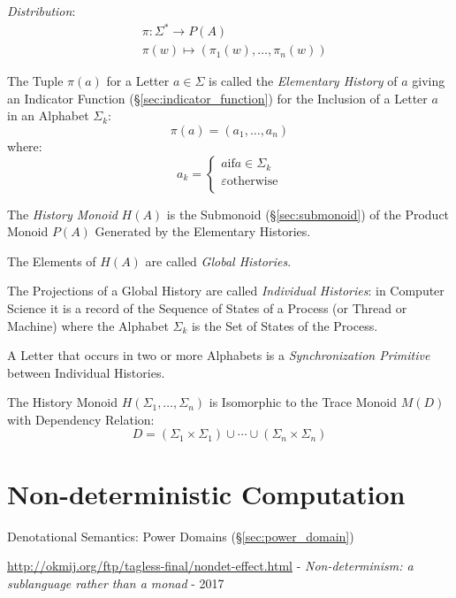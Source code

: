 \emph{Distribution}:
\begin{align*}
  & \pi : \Sigma^* \rightarrow P(A) \\
  & \pi(w) \mapsto (\pi_1(w), \ldots, \pi_n(w))
\end{align*}

The Tuple $\pi(a)$ for a Letter $a \in \Sigma$ is called the
\emph{Elementary History} of $a$ giving an Indicator Function
(\S\ref{sec:indicator_function}) for the Inclusion of a Letter $a$ in
an Alphabet $\Sigma_k$:
\[
  \pi(a) = (a_1, \ldots, a_n)
\]
where:
\[
  a_k =
  \begin{cases}
    a \text{if} a \in \Sigma_k \\
    \varepsilon \text{otherwise} \\
  \end{cases}
\]

The \emph{History Monoid} $H(A)$ is the Submonoid
(\S\ref{sec:submonoid}) of the Product Monoid $P(A)$ Generated by the
Elementary Histories.

The Elements of $H(A)$ are called \emph{Global Histories}.

The Projections of a Global History are called \emph{Individual
  Histories}: in Computer Science it is a record of the Sequence of
States of a Process (or Thread or Machine) where the Alphabet
$\Sigma_k$ is the Set of States of the Process.

A Letter that occurs in two or more Alphabets is a
\emph{Synchronization Primitive} between Individual Histories.

The History Monoid $H(\Sigma_1, \ldots, \Sigma_n)$ is Isomorphic to
the Trace Monoid $M(D)$ with Dependency Relation:
\[
  D = (\Sigma_1 \times \Sigma_1) \cup \cdots
    \cup (\Sigma_n \times \Sigma_n)
\]



\section{Non-deterministic Computation}
\label{sec:nondeterministic_computation}

Denotational Semantics: Power Domains (\S\ref{sec:power_domain})

\url{http://okmij.org/ftp/tagless-final/nondet-effect.html} -
\emph{Non-determinism: a sublanguage rather than a monad} - 2017



